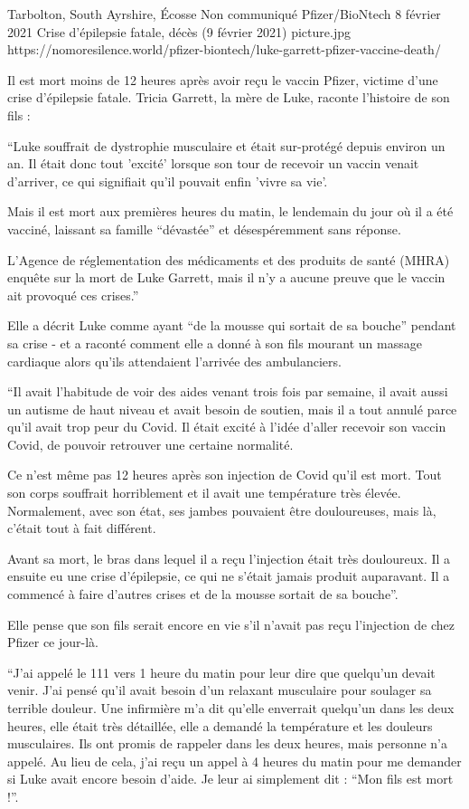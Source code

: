 {Tarbolton, South Ayrshire, Écosse}
{Non communiqué}
{Pfizer/BioNtech}
{8 février 2021}
{Crise d'épilepsie fatale, décès (9 février 2021)}
{picture.jpg}
{https://nomoresilence.world/pfizer-biontech/luke-garrett-pfizer-vaccine-death/}
{

Il est mort moins de 12 heures après avoir reçu le vaccin Pfizer, victime d'une
crise d'épilepsie fatale. Tricia Garrett, la mère de Luke, raconte l'histoire de
son fils :

“Luke souffrait de dystrophie musculaire et était sur-protégé depuis environ un
an. Il était donc tout 'excité' lorsque son tour de recevoir un vaccin venait
d'arriver, ce qui signifiait qu'il pouvait enfin 'vivre sa vie'.

Mais il est mort aux premières heures du matin, le lendemain du jour où il a été
vacciné, laissant sa famille “dévastée” et désespéremment sans réponse.

L'Agence de réglementation des médicaments et des produits de santé (MHRA)
enquête sur la mort de Luke Garrett, mais il n'y a aucune preuve que le vaccin
ait provoqué ces crises.”

Elle a décrit Luke comme ayant “de la mousse qui sortait de sa bouche” pendant sa crise - et a raconté comment elle a donné à son fils mourant un massage cardiaque alors qu'ils attendaient l'arrivée des ambulanciers.

“Il avait l'habitude de voir des aides venant trois fois par semaine, il avait aussi un autisme de haut niveau et avait besoin de soutien, mais il a tout annulé parce qu'il avait trop peur du Covid. Il était excité à l'idée d'aller recevoir son vaccin Covid, de pouvoir retrouver une certaine normalité.

Ce n'est même pas 12 heures après son injection de Covid qu'il est mort. Tout
son corps souffrait horriblement et il avait une température très
élevée. Normalement, avec son état, ses jambes pouvaient être douloureuses, mais
là, c'était tout à fait différent.

Avant sa mort, le bras dans lequel il a reçu l'injection était très
douloureux. Il a ensuite eu une crise d'épilepsie, ce qui ne s'était jamais
produit auparavant. Il a commencé à faire d'autres crises et de la mousse
sortait de sa bouche”.

Elle pense que son fils serait encore en vie s'il n'avait pas reçu l'injection
de chez Pfizer ce jour-là.

“J'ai appelé le 111 vers 1 heure du matin pour leur dire que quelqu'un devait
venir. J'ai pensé qu'il avait besoin d'un relaxant musculaire pour soulager sa
terrible douleur. Une infirmière m'a dit qu'elle enverrait quelqu'un dans les
deux heures, elle était très détaillée, elle a demandé la température et les
douleurs musculaires. Ils ont promis de rappeler dans les deux heures, mais
personne n'a appelé. Au lieu de cela, j'ai reçu un appel à 4 heures du matin
pour me demander si Luke avait encore besoin d'aide. Je leur ai simplement dit :
“Mon fils est mort !”.

}
